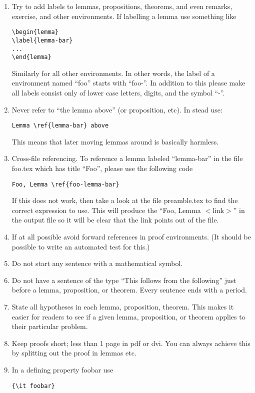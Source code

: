 \begin{enumerate}
\begin{verbatim}
\end{verbatim}
\item Try to add labels to lemmas, propositions, theorems, and even
remarks, exercise, and other environments.
If labelling a lemma use something like
\begin{verbatim}
\begin{lemma}
\label{lemma-bar}
...
\end{lemma}
\end{verbatim}
Similarly for all other environments. In other words, the label
of a environment named ``foo'' starts with ``foo-''. In addition to
this please make all labels consist only of lower case letters,
digits, and the symbol ``-''.
\item Never refer to ``the lemma above'' (or proposition, etc).
In stead use:
\begin{verbatim}
Lemma \ref{lemma-bar} above
\end{verbatim}
This means that later
moving lemmas around is basically harmless.
\item Cross-file referencing. To reference a lemma labeled
``lemma-bar'' in the file foo.tex which has title
``Foo'', please use the following code
\begin{verbatim}
Foo, Lemma \ref{foo-lemma-bar}
\end{verbatim}
If this does not work, then take a look at the file
preamble.tex to find the correct expression to use.
This will produce the ``Foo, Lemma $<$link$>$'' in the 
output file so it will be clear that the link points
out of the file.
\item If at all possible avoid forward references in proof
environments. (It should be possible to write an automated
test for this.)
\item Do not start any sentence with a mathematical symbol.
\item Do not have a sentence of the type ``This follows from
the following'' just before a lemma, proposition, or theorem.
Every sentence ends with a period.
\item State all hypotheses in each lemma, proposition, theorem.
This makes it easier for readers to see if a given
lemma, proposition, or theorem applies to their particular
problem.
\item Keep proofs short; less than 1 page in pdf or dvi.
You can always achieve this by splitting out the proof in lemmas
etc.
\item In a defining property foobar use
\begin{verbatim}
{\it foobar}

\end{verbatim}
\end{enumerate}
